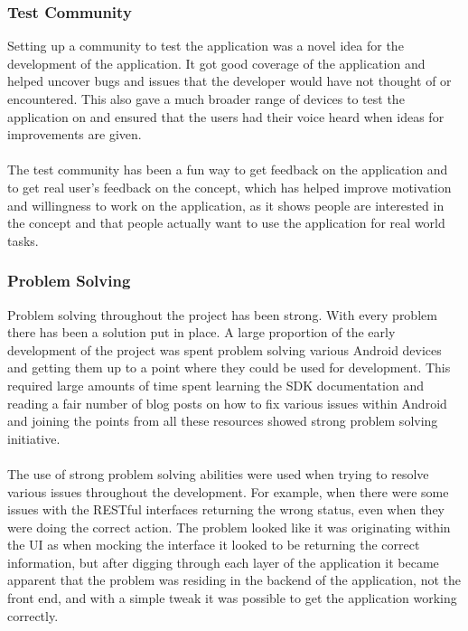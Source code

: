 \subsubsection{Test Community}

Setting up a community to test the application was a novel idea for the development of the application. It got good coverage of the application and helped uncover bugs and issues that the developer would have not thought of or encountered. This also gave a much broader range of devices to test the application on and ensured that the users had their voice heard when ideas for improvements are given.\\
\\
The test community has been a fun way to get feedback on the application and to get real user's feedback on the concept, which has helped improve motivation and willingness to work on the application, as it shows people are interested in the concept and that people actually want to use the application for real world tasks.

\subsubsection{Problem Solving}

Problem solving throughout the project has been strong. With every problem there has been a solution put in place. A large proportion of the early development of the project was spent problem solving various Android devices and getting them up to a point where they could be used for development. This required large amounts of time spent learning the SDK documentation and reading a fair number of blog posts on how to fix various issues within Android and joining the points from all these resources showed strong problem solving initiative.\\
\\
The use of strong problem solving abilities were used when trying to resolve various issues throughout the development. For example, when there were some issues with the RESTful interfaces returning the wrong status, even when they were doing the correct action. The problem looked like it was originating within the UI as when mocking the interface it looked to be returning the correct information, but after digging through each layer of the application it became apparent that the problem was residing in the backend of the application, not the front end, and with a simple tweak it was possible to get the application working correctly.

